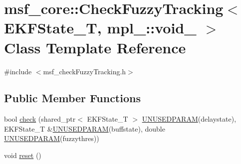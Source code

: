 \hypertarget{classmsf__core_1_1CheckFuzzyTracking_3_01EKFState__T_00_01mpl___1_1void___01_4}{\section{msf\-\_\-core\-:\-:Check\-Fuzzy\-Tracking$<$ E\-K\-F\-State\-\_\-\-T, mpl\-\_\-\-:\-:void\-\_\- $>$ Class Template Reference}
\label{classmsf__core_1_1CheckFuzzyTracking_3_01EKFState__T_00_01mpl___1_1void___01_4}
}


{\ttfamily \#include $<$msf\-\_\-check\-Fuzzy\-Tracking.\-h$>$}

\subsection*{Public Member Functions}
\begin{DoxyCompactItemize}
\item 
bool \hyperlink{classmsf__core_1_1CheckFuzzyTracking_3_01EKFState__T_00_01mpl___1_1void___01_4_ac64f28ba484886543a8c502e553ad7a2}{check} (shared\-\_\-ptr$<$ E\-K\-F\-State\-\_\-\-T $>$ \hyperlink{msf__macros_8h_a2d2af1048de7b1510994ffd3bc32aacc}{U\-N\-U\-S\-E\-D\-P\-A\-R\-A\-M}(delaystate), E\-K\-F\-State\-\_\-\-T \&\hyperlink{msf__macros_8h_a2d2af1048de7b1510994ffd3bc32aacc}{U\-N\-U\-S\-E\-D\-P\-A\-R\-A\-M}(buffstate), double \hyperlink{msf__macros_8h_a2d2af1048de7b1510994ffd3bc32aacc}{U\-N\-U\-S\-E\-D\-P\-A\-R\-A\-M}(fuzzythres))
\item 
void \hyperlink{classmsf__core_1_1CheckFuzzyTracking_3_01EKFState__T_00_01mpl___1_1void___01_4_af60f59eae93ed179973dfbb7f629f5bf}{reset} ()
\end{DoxyCompactItemize}



